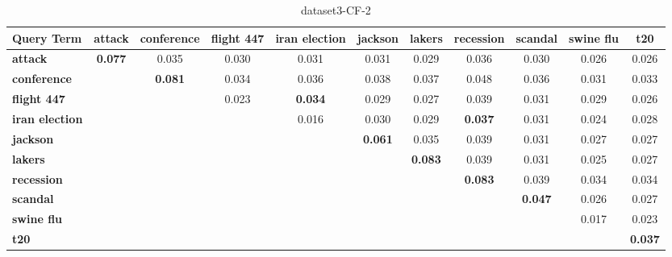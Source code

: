 \documentclass{sig-alternate}
\begin{document}
\begin{table}[!ht]
\centering
\resizebox{14cm}{!} 
{
	\begin{tabular}{|l|c|c|c|c|c|c|c|c|c|c|}
	\hline
\textbf{	Query Term} & \textbf{attack} & \textbf{conference} & \textbf{flight 447 }& \textbf{iran election} & \textbf{jackson} & \textbf{lakers} & \textbf{recession} &\textbf{ scandal} & \textbf{swine flu} & \textbf{t20}\\
	\hline
\textbf{	attack} & \textbf{0.077} & 0.035 & 0.030 & 0.031 & 0.031 & 0.029 & 0.036 & 0.030 & 0.026 & 0.026\\
	\hline	
\textbf{conference }& 	 & \textbf{0.081} & 0.034 & 0.036 & 0.038 & 0.037 & 0.048 & 0.036 & 0.031 & 0.033\\
	 	\hline
\textbf{flight 447	 } &  &  & 0.023 & \textbf{0.034} & 0.029 & 0.027 & 0.039 & 0.031 & 0.029 & 0.026\\
	  	\hline
\textbf{iran election	  } &  &  &  & 0.016 & 0.030 & 0.029 & \textbf{0.037} & 0.031 & 0.024 & 0.028 \\
	   	\hline
\textbf{jackson	  }&  &  &  &   &\textbf{ 0.061} & 0.035 & 0.039 & 0.031 & 0.027 & 0.027\\
	   	\hline
\textbf{lakers	}  &  &  &  &  &    & \textbf{0.083} & 0.039 & 0.031 & 0.025 & 0.027\\
	    	\hline
\textbf{	  recession } &  &  &  &  &  &   & \textbf{0.083 }& 0.039 & 0.034 & 0.034\\
	     	\hline
\textbf{scandal	 }&  &  &  &  &  &  &       & \textbf{0.047} & 0.026 & 0.027\\
	      	\hline
\textbf{swine flu	    }   &  &  &  &  &  &  &  &  & 0.017 & 0.023\\
	       \hline
\textbf{t20}	     &  &  &  &  &  &  &  &  &    & \textbf{0.037}\\
	\hline
	\end{tabular}
}
\caption{dataset3-CF-2}\label{cf5}
\end{table}
\end{document}
